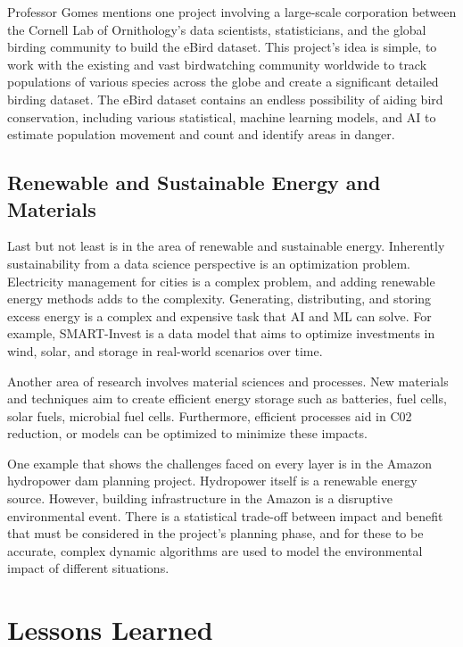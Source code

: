 \documentclass[journal,onecolumn]{IEEEtran}
\begin{document}
Professor Gomes mentions one project involving a large-scale corporation between the Cornell Lab of Ornithology's data scientists, statisticians, and the global birding community to build the eBird dataset. 
This project's idea is simple, to work with the existing and vast birdwatching community worldwide to track populations of various species across the globe and create a significant detailed birding dataset. 
The eBird dataset contains an endless possibility of aiding bird conservation, including various statistical, machine learning models, and AI to estimate population movement and count and identify areas in danger. 

\subsection{Renewable and Sustainable Energy and Materials}

Last but not least is in the area of renewable and sustainable energy. 
Inherently sustainability from a data science perspective is an optimization problem. 
Electricity management for cities is a complex problem, and adding renewable energy methods adds to the complexity. 
Generating, distributing, and storing excess energy is a complex and expensive task that AI and ML can solve. 
For example, SMART-Invest is a data model that aims to optimize investments in wind, solar, and storage in real-world scenarios over time. 

Another area of research involves material sciences and processes. New materials and techniques aim to create efficient energy storage such as batteries, fuel cells, solar fuels, microbial fuel cells.
Furthermore, efficient processes aid in C02 reduction, or models can be optimized to minimize these impacts.

One example that shows the challenges faced on every layer is in the Amazon hydropower dam planning project. 
Hydropower itself is a renewable energy source. However, building infrastructure in the Amazon is a disruptive environmental event. 
There is a statistical trade-off between impact and benefit that must be considered in the project's planning phase, and for these to be accurate, complex dynamic algorithms are used to model the environmental impact of different situations.

\section{Lessons Learned}
\end{document}
